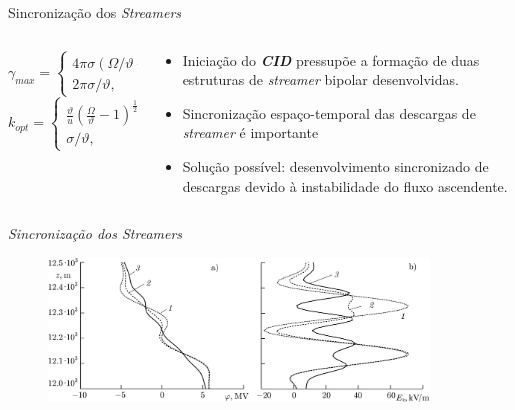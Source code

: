 \documentclass{beamer}
\begin{document}
\begin{frame}{Sincronização dos \textit{Streamers}}
	\begin{columns}
		\begin{column}{0.5\textwidth}
			\begin{equation}
				\gamma_{max} = \begin{cases}
					4\pi\sigma\left(\Omega/\vartheta-1\right)^2, & \Omega/\vartheta < 2 \\ 
					2\pi\sigma/\vartheta, & \Omega/\vartheta > 2 
				\end{cases}
				\label{eqn_4}	
			\end{equation}
			\begin{equation}
				k_{opt} = \begin{cases}
					\frac{\vartheta}{u} \left(\frac{\Omega}{\vartheta}-1\right)^{\frac{1}{2}}& \Omega/\vartheta < 2 \\ 
					\sigma/\vartheta, & \Omega/\vartheta > 2 
				\end{cases}
				\label{eqn_5}	
			\end{equation}
		\end{column}
		\begin{column}{0.5\textwidth}
			\begin{itemize}
				\item Iniciação do \textbf{\textit{CID}} pressupõe a formação de duas estruturas de \textit{streamer} bipolar desenvolvidas.
				\item Sincronização espaço-temporal das descargas de \textit{streamer} é importante
				\item Solução possível: desenvolvimento sincronizado de descargas devido à instabilidade do fluxo ascendente.
			\end{itemize}
		\end{column}
	\end{columns}
\end{frame}
\begin{frame}{\textit{Sincronização dos Streamers}}

	\begin{figure}
		\centering
		\includegraphics[width=0.9\textwidth]{imagens_artigo/12.png}
	\end{figure}
		
\end{frame}
\end{document}
